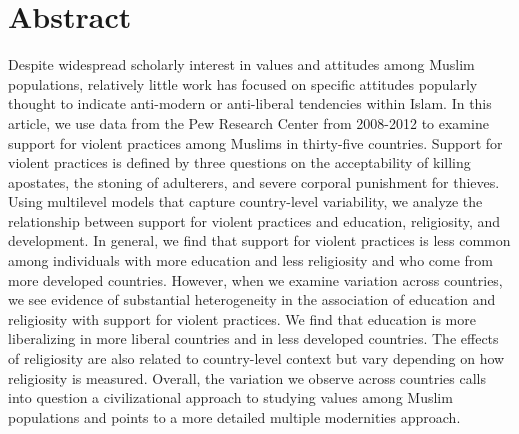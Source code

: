\documentclass[10pt,letterpaper]{article}
\begin{document}
\section*{Abstract}

Despite widespread scholarly interest in values and attitudes among Muslim populations, relatively little work has focused on specific attitudes popularly thought to indicate anti-modern or anti-liberal tendencies within Islam. In this article, we use data from the Pew Research Center from 2008-2012 to examine support for violent practices among Muslims in thirty-five countries. Support for violent practices is defined by three questions on the acceptability of killing apostates, the stoning of adulterers, and severe corporal punishment for thieves. Using multilevel models that capture country-level variability, we analyze the relationship between support for violent practices and education, religiosity, and development. In general, we find that support for violent practices is less common among individuals with more education and less religiosity and who come from more developed countries. However, when we examine variation across countries, we see evidence of substantial heterogeneity in the association of education and religiosity with support for violent practices. We find that education is more liberalizing in more liberal countries and in less developed countries. The effects of religiosity are also related to country-level context but vary depending on how religiosity is measured. Overall, the variation we observe across countries calls into question a civilizational approach to studying values among Muslim populations and points to a more detailed multiple modernities approach.

\end{document}
